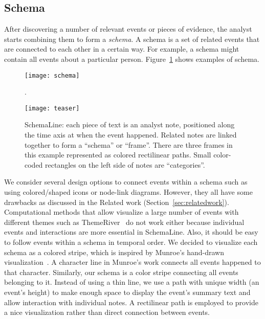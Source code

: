 \subsection{Schema}
After discovering a number of relevant events or pieces of evidence, the analyst starts combining them to form a \textit{schema}. A schema is a set of related events that are connected to each other in a certain way. For example, a schema might contain all events about a particular person. Figure~\ref{fig:schema} shows examples of schema. 

\begin{figure}[ht]
	\centering
	\texttt{[image: schema]}
	\caption{.}
	\label{fig:schema}
\end{figure}

\begin{figure}[ht]
\centering
\texttt{[image: teaser]}
\caption{SchemaLine: each piece of text is an analyst note, positioned along the time axis at when the event happened. Related notes are linked together to form a ``schema'' or ``frame''. There are three frames in this example represented as colored rectilinear paths. Small color-coded rectangles on the left side of notes are ``categories''.}
\label{fig:teaser}
\end{figure}

We consider several design options to connect events within a schema such as using colored/shaped icons or node-link diagrams. However, they all have some drawbacks as discussed in the Related work (Section~\ref{sec:relatedwork}). Computational methods that allow visualize a large number of events with different themes such as ThemeRiver~\cite{Havre2002} do not work either because individual events and interactions are more essential in SchemaLine.  Also, it should be easy to follow events within a schema in temporal order. We decided to visualize each schema as a colored stripe, which is inspired by Munroe's hand-drawn visualization~\cite{Munroe2009}. A character line in Munroe's work connects all events happened to that character. Similarly, our schema is a color stripe connecting all events belonging to it. Instead of using a thin line, we use a path with unique width (an event's height) to make enough space to display the event's summary text and allow interaction with individual notes. A rectilinear path is employed to provide a nice visualization rather than direct connection between events. 